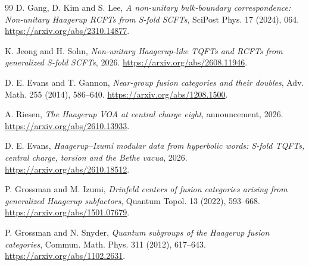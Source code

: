 \documentclass[11pt,a4paper]{article}
\numberwithin{equation}{section}
\theoremstyle{definition}\newtheorem{definition}[theorem]{Definition}
\theoremstyle{remark}\newtheorem{remark}[theorem]{Remark}
\begin{document}
\begin{thebibliography}{99}
D. Gang, D. Kim and S. Lee, \emph{A non-unitary bulk-boundary
correspondence: Non-unitary Haagerup RCFTs from S-fold SCFTs},
SciPost Phys. 17 (2024), 064.
\url{https://arxiv.org/abs/2310.14877}.

K. Jeong and H. Sohn, \emph{Non-unitary Haagerup-like TQFTs and
RCFTs from generalized S-fold SCFTs}, 2026.
\url{https://arxiv.org/abs/2608.11946}.

D. E. Evans and T. Gannon, \emph{Near-group fusion categories and
their doubles}, Adv. Math. 255 (2014), 586--640.
\url{https://arxiv.org/abs/1208.1500}.

A. Riesen, \emph{The Haagerup VOA at central charge eight},
announcement, 2026. \url{https://arxiv.org/abs/2610.13933}.

D. E. Evans, \emph{Haagerup--Izumi modular data from hyperbolic
words: S-fold TQFTs, central charge, torsion and the Bethe vacua},
2026. \url{https://arxiv.org/abs/2610.18512}.

P. Grossman and M. Izumi, \emph{Drinfeld centers of fusion categories
arising from generalized Haagerup subfactors},
Quantum Topol. 13 (2022), 593--668.
\url{https://arxiv.org/abs/1501.07679}.

P. Grossman and N. Snyder, \emph{Quantum subgroups of the Haagerup
fusion categories}, Commun. Math. Phys. 311 (2012), 617--643.
\url{https://arxiv.org/abs/1102.2631}.

\end{thebibliography}
\end{document}
